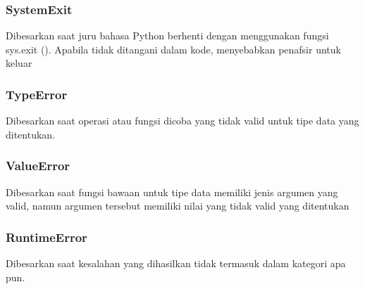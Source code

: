 \subsubsection{SystemExit} 
Dibesarkan saat juru bahasa Python berhenti dengan menggunakan fungsi sys.exit (). Apabila tidak ditangani dalam kode, menyebabkan penafsir untuk keluar

\subsubsection{TypeError} 
Dibesarkan saat operasi atau fungsi dicoba yang tidak valid untuk tipe data yang ditentukan.
\subsubsection{ValueError}
Dibesarkan saat fungsi bawaan untuk tipe data memiliki jenis argumen yang valid, namun argumen tersebut memiliki nilai yang tidak valid yang ditentukan

\subsubsection{RuntimeError} 
Dibesarkan saat kesalahan yang dihasilkan tidak termasuk dalam kategori apa pun.

